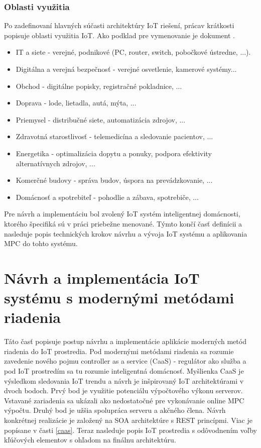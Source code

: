 \subsubsection{Oblasti využitia}
Po zadefinovaní hlavných súčasti architektúry IoT riešení, prácav krátkosti popisuje oblasti využitia IoT. Ako podklad pre vymenovanie je dokument \cite{IOT24}.
\begin{itemize}
\item IT a siete - verejné, podnikové (PC, router, switch, pobočkové ústredne, ...).
\item Digitálna a verejná bezpečnosť - verejné osvetlenie, kamerové systémy...
\item Obchod - digitálne popisky, registračné pokladnice, ... 
\item Doprava - lode, lietadla, autá, mýta, ...
\item Priemysel - distribučné siete, automatizácia zdrojov, ...
\item Zdravotná starostlivosť - telemedicína a sledovanie pacientov, ...
\item Energetika - optimalizácia dopytu a ponuky, podpora efektivity alternatívnych zdrojov, ...
\item Komerčné budovy - správa budov, úspora na prevádzkovanie, ...
\item Domácnosť a spotrebiteľ - pohodlie a zábava, spotrebiče, ...
\end{itemize}
Pre návrh a implementáciu bol zvolený  IoT systém inteligentnej domácnosti, ktorého špecifiká sú v práci priebežne menované. Týmto končí časť definícii a nasleduje popis technických krokov návrhu a vývoja IoT systému a aplikovania MPC do tohto systému.
\section{Návrh a implementácia IoT systému s modernými metódami riadenia}
Táto časť popisuje postup návrhu a implementácie aplikácie moderných metód riadenia do IoT prostredia. Pod modernými metódami riadenia sa rozumie zavedenie nového pojmu controller as a service (CaaS) - regulátor ako služba a pod IoT prostredím sa tu rozumie inteligentná domácnosť. Myšlienka CaaS je výsledkom sledovania IoT trendu a návrh je inšpirovaný IoT architektúrami v dvoch bodoch. Prvý bod je využitie potenciálu výpočtového výkonu serverov. Vstavané zariadenia sa ukázali ako nedostatočné pre vykonávanie online MPC výpočtu. Druhý bod je užšia spolupráca serveru a akčného člena.  Návrh konkrétnej realizácie je založený na SOA architektúre s REST princípmi. Viac je popísane v časti \ref{caas}. 
Teraz nasleduje popis IoT prostredia s odôvodnením voľby kľúčových elementov s ohľadom na finálnu architektúru.

